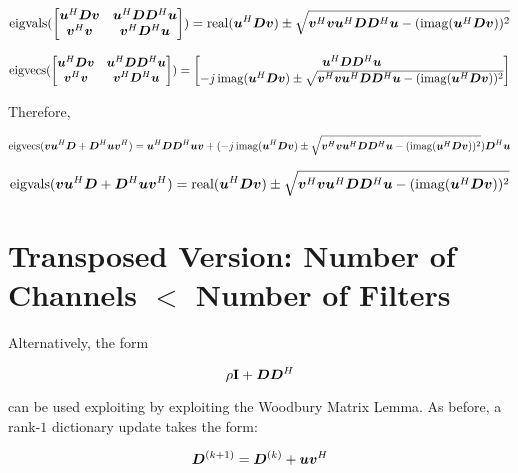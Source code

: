 \documentclass{article}
\begin{document}
\begin{equation}
\operatorname{eigvals}(\begin{bmatrix}
\bm{u}^H\bm{D}\bm{v} & \bm{u}^H\bm{D}\bm{D}^H\bm{u} \\
\bm{v}^H\bm{v}    & \bm{v}^H\bm{D}^H\bm{u}
\end{bmatrix})
= \operatorname{real}(\bm{u}^H\bm{D}\bm{v}) \pm \sqrt{\bm{v}^H\bm{v}\bm{u}^H\bm{D}\bm{D}^H\bm{u} - (\operatorname{imag}(\bm{u}^H\bm{D}\bm{v}))^2}
\end{equation}

\begin{equation}
\operatorname{eigvecs}
(\begin{bmatrix}
\bm{u}^H\bm{D}\bm{v} & \bm{u}^H\bm{D}\bm{D}^H\bm{u} \\
\bm{v}^H\bm{v}    & \bm{v}^H\bm{D}^H\bm{u}
\end{bmatrix})
= \begin{bmatrix}
\bm{u}^H\bm{D}\bm{D}^H\bm{u} \\
-j\operatorname{imag}(\bm{u}^H\bm{D}\bm{v}) \pm \sqrt{\bm{v}^H\bm{v}\bm{u}^H\bm{D}\bm{D}^H\bm{u} - (\operatorname{imag}(\bm{u}^H\bm{D}\bm{v}))^2}
\end{bmatrix}
\end{equation}

Therefore,

\begin{equation}
\operatorname{eigvecs}
(
\bm{v}\bm{u}^H\bm{D} + \bm{D}^H\bm{u}\bm{v}^H
) = 
\bm{u}^H\bm{D}\bm{D}^H\bm{u}\bm{v} +
(-j\operatorname{imag}(\bm{u}^H\bm{D}\bm{v}) \pm \sqrt{\bm{v}^H\bm{v}\bm{u}^H\bm{D}\bm{D}^H\bm{u} - (\operatorname{imag}(\bm{u}^H\bm{D}\bm{v}))^2})\bm{D}^H\bm{u}
\end{equation}

\begin{equation}
\operatorname{eigvals}(
\bm{v}\bm{u}^H\bm{D} + \bm{D}^H\bm{u}\bm{v}^H
)
= \operatorname{real}(\bm{u}^H\bm{D}\bm{v}) \pm \sqrt{\bm{v}^H\bm{v}\bm{u}^H\bm{D}\bm{D}^H\bm{u} - (\operatorname{imag}(\bm{u}^H\bm{D}\bm{v}))^2}
\end{equation}

\section{Transposed Version: Number of Channels $<$ Number of Filters}

Alternatively, the form

\begin{equation}
\rho{\bf I} + \bm{D}\bm{D}^H
\end{equation}

can be used exploiting by exploiting the Woodbury Matrix Lemma. As before, a rank-$1$ dictionary update takes the form:

\begin{equation}
\bm{D}^{(k+1)} = \bm{D}^{(k)} + \bm{u}\bm{v}^H
\end{equation}
\end{document}
